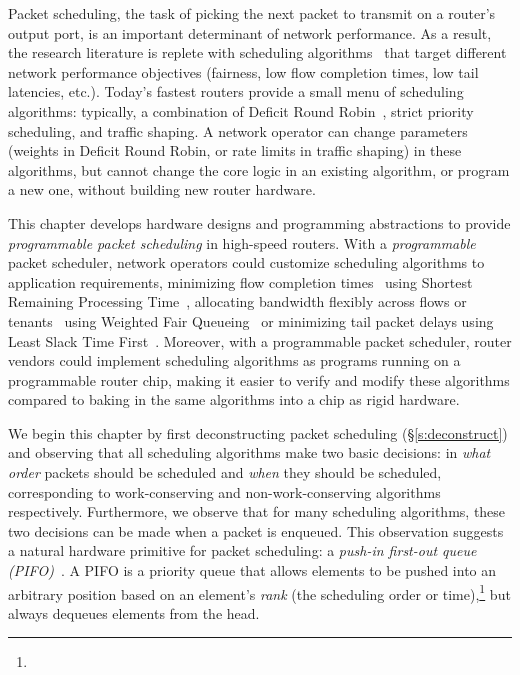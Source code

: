 Packet scheduling, the task of picking the next packet to transmit on a
router's output port, is an important determinant of network performance. As a
result, the research literature is replete with scheduling
algorithms~\cite{wfq, srr, lstf, drr, pFabric} that target different network
performance objectives (\eg fairness, low flow completion times, low tail
latencies, etc.).  Today's fastest routers provide a small menu of scheduling
algorithms: typically, a combination of Deficit Round Robin~\cite{drr}, strict
priority scheduling, and traffic shaping. A network operator can change
parameters (\eg weights in Deficit Round Robin, or rate limits in traffic
shaping) in these algorithms, but cannot change the core logic in an existing
algorithm, or program a new one, without building new router hardware.

 This chapter develops hardware designs and programming abstractions to provide
{\em programmable packet scheduling} in high-speed routers. With a {\em
programmable} packet scheduler, network operators could customize scheduling
algorithms to application requirements, \eg minimizing flow completion
times~\cite{pFabric} using Shortest Remaining Processing Time~\cite{srpt},
allocating bandwidth flexibly across flows or tenants~\cite{eyeq, faircloud}
using Weighted Fair Queueing~\cite{wfq} or minimizing tail packet delays using
Least Slack Time First~\cite{lstf}.  Moreover, with a programmable packet
scheduler, router vendors could implement scheduling algorithms as programs
running on a programmable router chip, making it easier to verify and modify
these algorithms compared to baking in the same algorithms into a chip as rigid
hardware.

We begin this chapter by first deconstructing packet scheduling
(\S\ref{s:deconstruct}) and observing that all scheduling algorithms make two
basic decisions: in {\em what order} packets should be scheduled and {\em when}
they should be scheduled, corresponding to work-conserving and
non-work-conserving algorithms respectively.  Furthermore, we observe that for
many scheduling algorithms, these two decisions can be made when a packet is
enqueued. This observation suggests a natural hardware primitive for packet
scheduling: a {\em push-in first-out queue (PIFO)}~\cite{pifo}. A PIFO is a
priority queue that allows elements to be pushed into an arbitrary position
based on an element's {\em rank} (the scheduling order or
time),\footnote{} but always dequeues elements from the head.

